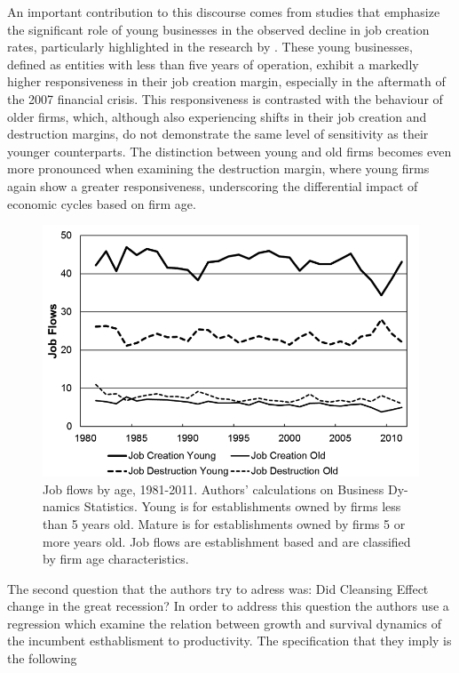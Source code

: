 \documentclass[12pt]{article}
\begin{document}
An important contribution to this discourse comes from studies that emphasize the significant role of young businesses
in the observed decline in job creation rates, particularly highlighted in the research by \cite{fort2013firms}. These young
businesses, defined as entities with less than five years of operation, exhibit a markedly higher responsiveness in
their job creation margin, especially in the aftermath of the 2007 financial crisis. This responsiveness is contrasted
with the behaviour of older firms, which, although also experiencing shifts in their job creation and destruction
margins, do not demonstrate the same level of sensitivity as their younger counterparts. The distinction between young
and old firms becomes even more pronounced when examining the destruction margin, where young firms again show a greater
responsiveness, underscoring the differential impact of economic cycles based on firm age. 
\begin{figure}
    \centering
    \includegraphics[scale = 0.54]{Plot1.2.png}
    \caption{Job ﬂows by age, 1981-2011. Authors' calculations on Business Dy-
    namics Statistics. Young is for establishments owned by ﬁrms less than 5 years old.
    Mature is for establishments owned by ﬁrms 5 or more years old. Job ﬂows are
    establishment based and are classiﬁed by ﬁrm age characteristics.
    }
    \label{plot:1.1}
\end{figure} 
The second question that the authors try to adress was: Did Cleansing Effect change in the great recession?
In order to address this question the authors use a regression which examine the relation between growth and survival
dynamics of the incumbent  esthablisment to productivity. The specification that they imply is the following 
\end{document}
